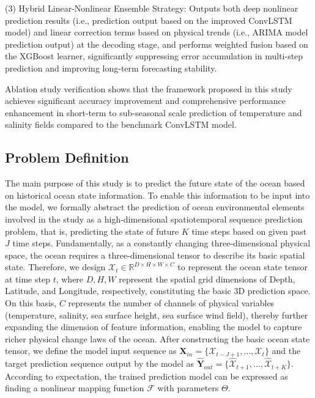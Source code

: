 \documentclass[webpdf,contemporary,large]{oup-authoring-template}
\begin{document}
(3) Hybrid Linear-Nonlinear Ensemble Strategy: Outputs both deep nonlinear prediction results (i.e., prediction output based on the improved ConvLSTM model) and linear correction terms based on physical trends (i.e., ARIMA model prediction output) at the decoding stage, and performs weighted fusion based on the XGBoost learner, significantly suppressing error accumulation in multi-step prediction and improving long-term forecasting stability.

Ablation study verification shows that the framework proposed in this study achieves significant accuracy improvement and comprehensive performance enhancement in short-term to sub-seasonal scale prediction of temperature and salinity fields compared to the benchmark ConvLSTM model.

\subsection{Problem Definition}

The main purpose of this study is to predict the future state of the ocean based on historical ocean state information. To enable this information to be input into the model, we formally abstract the prediction of ocean environmental elements involved in the study as a high-dimensional spatiotemporal sequence prediction problem, that is, predicting the state of future $K$ time steps based on given past $J$ time steps.
Fundamentally, as a constantly changing three-dimensional physical space, the ocean requires a three-dimensional tensor to describe its basic spatial state. Therefore, we design $\mathcal{X}_t \in \mathbb{R}^{D \times H \times W \times C}$ to represent the ocean state tensor at time step $t$, where $D, H, W$ represent the spatial grid dimensions of Depth, Latitude, and Longitude, respectively, constituting the basic 3D prediction space. On this basis, $C$ represents the number of channels of physical variables (temperature, salinity, sea surface height, sea surface wind field), thereby further expanding the dimension of feature information, enabling the model to capture richer physical change laws of the ocean.
After constructing the basic ocean state tensor, we define the model input sequence as $\mathbf{X}_{in} = \{\mathcal{X}_{t-J+1}, \dots, \mathcal{X}_t\}$ and the target prediction sequence output by the model as $\hat{\mathbf{Y}}_{out} = \{\hat{\mathcal{X}}_{t+1}, \dots, \hat{\mathcal{X}}_{t+K}\}$. According to expectation, the trained prediction model can be expressed as finding a nonlinear mapping function $\mathcal{F}$ with parameters $\Theta$.
\end{document}
